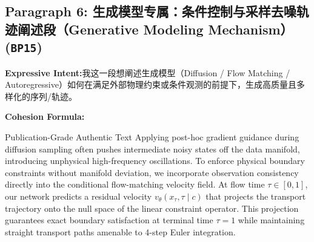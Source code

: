 \subsection*{Paragraph 6: 生成模型专属：条件控制与采样去噪轨迹阐述段（Generative Modeling Mechanism） (\texttt{BP15})}
\noindent\textbf{Expressive Intent:}\enspace 我这一段想阐述生成模型（Diffusion / Flow Matching / Autoregressive）如何在满足外部物理约束或条件观测的前提下，生成高质量且多样化的序列/轨迹。\par
\noindent\textbf{Cohesion Formula:}\par\vspace{4pt}
\begin{ExampleBox}{Publication-Grade Authentic Text}
Applying post-hoc gradient guidance during diffusion sampling often pushes intermediate noisy states off the data manifold, introducing unphysical high-frequency oscillations. To enforce physical boundary constraints without manifold deviation, we incorporate observation consistency directly into the conditional flow-matching velocity field. At flow time $\tau \in [0, 1]$, our network predicts a residual velocity $v_\theta(x_\tau, \tau \mid c)$ that projects the transport trajectory onto the null space of the linear constraint operator. This projection guarantees exact boundary satisfaction at terminal time $\tau=1$ while maintaining straight transport paths amenable to 4-step Euler integration.
\end{ExampleBox}
